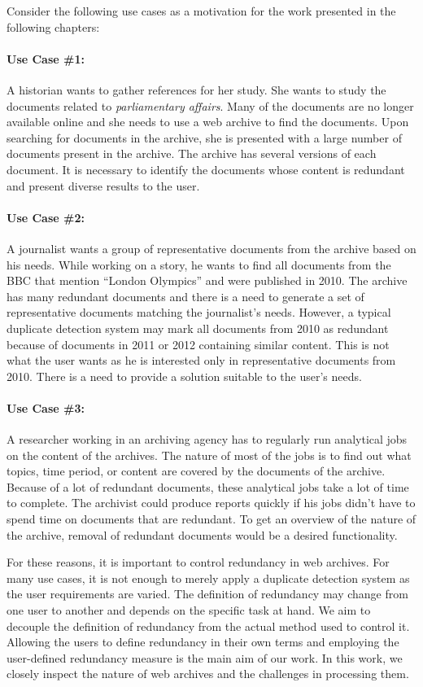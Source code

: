 Consider the following use cases as a motivation for the work presented in the
following chapters:

\paragraph{Use Case \#1:} A historian wants to gather references for her study. She
wants to study the documents related to \emph{parliamentary affairs}. Many of the
documents are no longer available online and she needs to use a web archive to
find the documents. Upon searching for documents in the archive, she is
presented with a large number of documents present in the archive. The archive
has several versions of each document. It is necessary to identify the documents
whose content is redundant and present diverse results to the user.

\paragraph{Use Case \#2:} A journalist wants a group of representative documents from
the archive based on his needs. While working on a story, he wants to find all
documents from the BBC that mention ``London Olympics'' and were published in
2010. The archive has many redundant documents and there is a need to generate a
set of representative documents matching the journalist's needs. However, a
typical duplicate detection system may mark all documents from 2010 as redundant
because of documents in 2011 or 2012 containing similar content. This is not
what the user wants as he is interested only in representative documents from
2010. There is a need to provide a solution suitable to the user's needs.

\paragraph{Use Case \#3:} A researcher working in an archiving agency has to
regularly run analytical jobs on the content of the archives. The nature of most
of the jobs is to find out what topics, time period, or content are covered by
the documents of the archive. Because of a lot of redundant documents, these
analytical jobs take a lot of time to complete. The archivist could produce
reports quickly if his jobs didn't have to spend time on documents that are
redundant. To get an overview of the nature of the archive, removal of redundant
documents would be a desired functionality.

For these reasons, it is important to control redundancy in web archives. For
many use cases, it is not enough to merely apply a duplicate detection system as
the user requirements are varied. The definition of redundancy may change from
one user to another and depends on the specific task at hand. We aim to decouple
the definition of redundancy from the actual method used to control it. Allowing
the users to define redundancy in their own terms and employing the user-defined
redundancy measure is the main aim of our work. In this work, we closely inspect
the nature of web archives and the challenges in processing them. 

